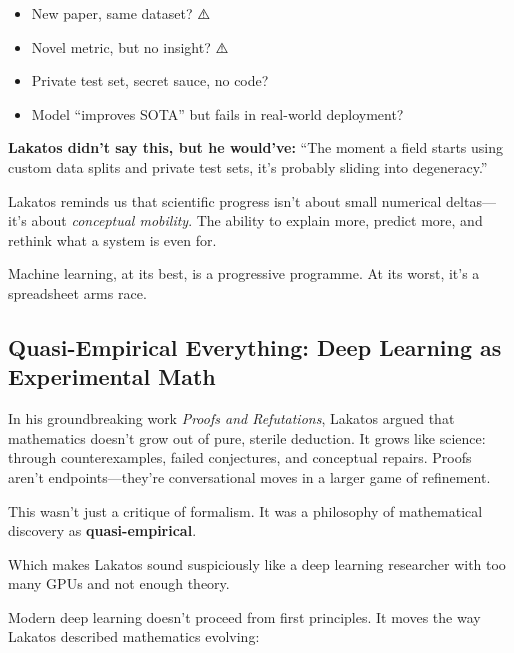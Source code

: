 \begin{tcolorbox}[colback=gray!5!white, colframe=black, title=\textbf{Sidebar: How to Spot Degeneracy}, fonttitle=\bfseries, arc=1.5mm, boxrule=0.4pt]
\vspace{-0.5em}
\begin{itemize}
  \item New paper, same dataset? ⚠️
  \item Novel metric, but no insight? ⚠️
  \item Private test set, secret sauce, no code? 🚨
  \item Model “improves SOTA” but fails in real-world deployment? 🚨
\end{itemize}

\textbf{Lakatos didn’t say this, but he would’ve:}  
“The moment a field starts using custom data splits and private test sets, it’s probably sliding into degeneracy.”
\end{tcolorbox}

\bigskip

Lakatos reminds us that scientific progress isn’t about small numerical deltas—it’s about \textit{conceptual mobility}. The ability to explain more, predict more, and rethink what a system is even for.

Machine learning, at its best, is a progressive programme.  
At its worst, it’s a spreadsheet arms race.


\subsection{Quasi-Empirical Everything: Deep Learning as Experimental Math}

In his groundbreaking work \textit{Proofs and Refutations}, Lakatos argued that mathematics doesn’t grow out of pure, sterile deduction. It grows like science: through counterexamples, failed conjectures, and conceptual repairs. Proofs aren’t endpoints—they’re conversational moves in a larger game of refinement.

This wasn’t just a critique of formalism. It was a philosophy of mathematical discovery as \textbf{quasi-empirical}.

Which makes Lakatos sound suspiciously like a deep learning researcher with too many GPUs and not enough theory.

\bigskip

Modern deep learning doesn’t proceed from first principles. It moves the way Lakatos described mathematics evolving:

